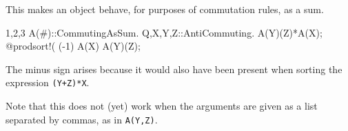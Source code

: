 
This makes an object behave, for purposes of commutation rules, as a
sum.
\begin{screen}{1,2,3}
A(#)::CommutingAsSum.
{Q,X,Y,Z}::AntiCommuting.
A(Y)(Z)*A(X);
@prodsort!(%
(-1) A(X) A(Y)(Z);
\end{screen}
The minus sign arises because it would also have been present when
sorting the expression {\tt (Y+Z)*X}. 

Note that this does not (yet) work when the arguments are given as a
list separated by commas, as in {\tt A(Y,Z)}.


